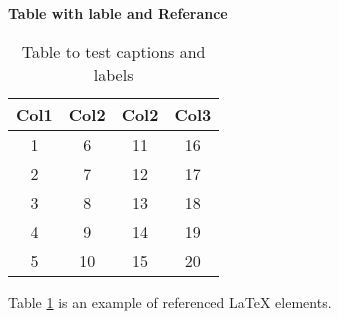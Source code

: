 \documentclass{article}
\begin{document}
\centering 
\textbf{Table with lable and Referance}

\begin{table}[h!] %
\centering 
\begin{tabular}{||c | c | c | c||} 
\hline 
Col1 & Col2 & Col2 & Col3 \\ [2ex] 
\hline\hline 
1 & 6 & 11 & 16 \\ 
2 & 7 & 12 & 17 \\ 
3 & 8 & 13 & 18 \\ 
4 & 9 & 14 & 19 \\ 
5 & 10 & 15 & 20 \\ 
\hline 
\end{tabular} 
\caption{Table to test captions and labels} %
\label{table:data}

Table \ref{table:data} is an example of referenced \LaTeX{} elements.

\end{table}
\end{document}
